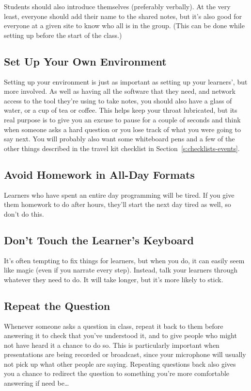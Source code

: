 Students should also introduce themselves (preferably verbally). At the
very least, everyone should add their name to the shared notes, but it's
also good for everyone at a given site to know who all is in the group.
(This can be done while setting up before the start of the class.)

\subsection*{Set Up Your Own Environment}

Setting up your environment is just as important as setting up your
learners', but more involved. As well as having all the software that
they need, and network access to the tool they're using to take notes,
you should also have a glass of water, or a cup of tea or coffee. This
helps keep your throat lubricated, but its real purpose is to give you
an excuse to pause for a couple of seconds and think when someone asks a
hard question or you lose track of what you were going to say next. You
will probably also want some whiteboard pens and a few of the other
things described in the travel kit checklist in Section~\ref{s:checklists-events}.

\subsection*{Avoid Homework in All-Day Formats}

Learners who have spent an entire day programming will be tired. If you
give them homework to do after hours, they'll start the next day tired
as well, so don't do this.

\subsection*{Don't Touch the Learner's Keyboard}

It's often tempting to fix things for learners, but when you do, it can
easily seem like magic (even if you narrate every step). Instead, talk
your learners through whatever they need to do. It will take longer, but
it's more likely to stick.

\subsection*{Repeat the Question}

Whenever someone asks a question in class, repeat it back to them before
answering it to check that you've understood it, and to give people who
might not have heard it a chance to do so. This is particularly
important when presentations are being recorded or broadcast, since your
microphone will usually not pick up what other people are saying.
Repeating questions back also gives you a chance to redirect the
question to something you're more comfortable answering if need
be{\ldots}

